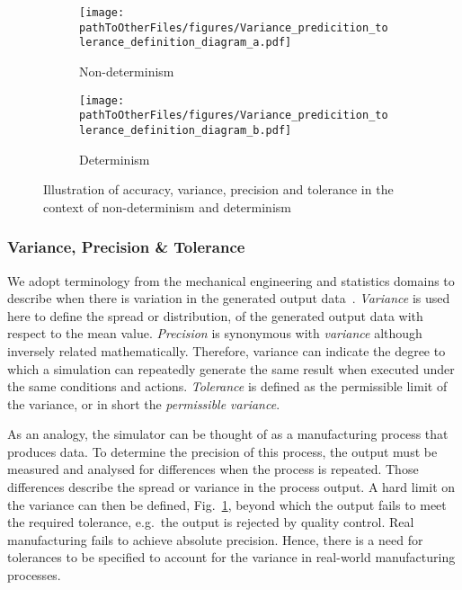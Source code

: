 \begin{figure}[!t]
    \centering

    \begin{subfigure}{.48\textwidth}
        \texttt{[image: \\pathToOtherFiles/figures/Variance\_predicition\_tolerance\_definition\_diagram\_a.pdf]}
        \caption{Non-determinism}
        \label{variance_description_a}
    \end{subfigure}

    \begin{subfigure}{.48\textwidth}
        \texttt{[image: \\pathToOtherFiles/figures/Variance\_predicition\_tolerance\_definition\_diagram\_b.pdf]}
        \caption{Determinism}
        \label{variance_description_b}
    \end{subfigure}

    \caption{Illustration of accuracy, variance, precision and tolerance in the context of non-determinism and determinism}
    \label{variance_description}
\end{figure}


\subsubsection{Variance, Precision \& Tolerance}
We adopt terminology from the mechanical engineering and statistics domains to describe when there is variation in the generated output data~\cite{ADictionaryofMechanicalEngineering}. \textit{Variance} is used here to define the spread or distribution, of the generated output data with respect to the mean value. \textit{Precision} is synonymous with \textit{variance} although inversely related mathematically. Therefore, variance can indicate the degree to which a simulation can repeatedly generate the same result when executed under the same conditions and actions. \textit{Tolerance} is defined as the permissible limit of the variance, or in short the \textit{permissible variance}. 

As an analogy, the simulator can be thought of as a manufacturing process that produces data. To determine the precision of this process, the output must be measured and analysed for differences when the process is repeated. Those differences describe the spread or variance in the process output. A hard limit on the variance can then be defined, Fig.~\ref{variance_description_a}, beyond which the output fails to meet the required tolerance, e.g.\ the output is rejected by quality control. Real manufacturing fails to achieve absolute precision. Hence, there is a need for tolerances to be specified to account for the variance in real-world manufacturing processes. 


